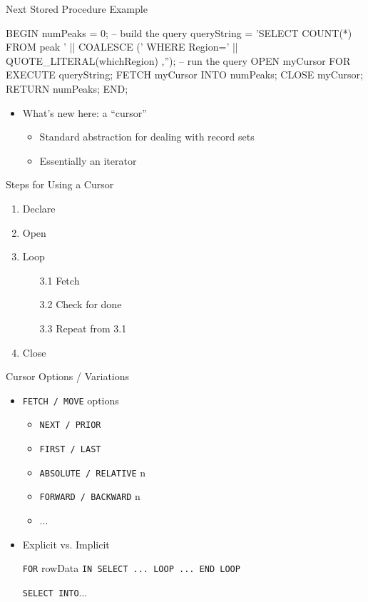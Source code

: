 \documentclass[aspectratio=169]{beamer}
\begin{document}
\begin{frame}[fragile]{Next Stored Procedure Example}

\begin{SQL}
BEGIN
  numPeaks = 0;
  -- build the query
  queryString = 'SELECT COUNT(*) FROM peak ' || COALESCE (' WHERE Region=' || 
       QUOTE_LITERAL(whichRegion) ,'');
  -- run the query
  OPEN myCursor FOR EXECUTE queryString;
  FETCH  myCursor INTO numPeaks;
  CLOSE myCursor;
  RETURN numPeaks;
END;
\end{SQL}

\begin{itemize}
\item What's new here: a ``cursor''
\begin{itemize}
	\item Standard abstraction for dealing with record sets
	\item Essentially an iterator
\end{itemize}
\end{itemize}
\end{frame}
\begin{frame}[fragile]{Steps for Using a Cursor}
\begin{enumerate}
\item Declare
\item Open
\item Loop
\begin{enumerate}
\item[3.1] Fetch 
\item[3.2] Check for done
\item[3.3] Repeat from 3.1
\end{enumerate}
\item Close
\end{enumerate}
\end{frame}

\begin{frame}[fragile]{Cursor Options / Variations}
\begin{itemize}
\item \texttt{FETCH / MOVE} options
\begin{itemize}
\item \texttt{NEXT / PRIOR}
\item \texttt{FIRST / LAST}
\item \texttt{ABSOLUTE / RELATIVE} n
\item \texttt{FORWARD / BACKWARD} n
\item ...
\end{itemize}
\item Explicit vs. Implicit
\item[] \texttt{FOR} rowData \texttt{IN SELECT ... LOOP ... END LOOP}
\item[] \texttt{SELECT INTO}...
\end{itemize}
\end{frame}
\end{document}
